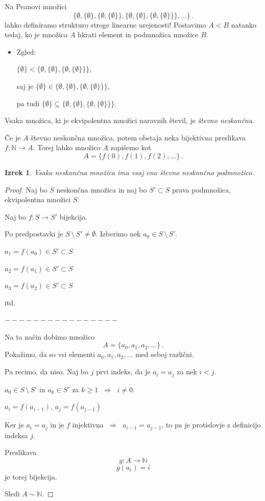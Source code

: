 \documentclass[11pt,paper=b5,DIV=13,headinclude,footinclude]{scrbook}
\def\sledi {{~\Rightarrow~}}
\def\brez {{\,\setminus\,}}
\newtheorem*{izrek}{Izrek}
\begin{document}
\bigskip
Na Peanovi množici
 $$\{\emptyset, \{\emptyset\}, \{\emptyset, \{\emptyset\}\}, \{\emptyset, \{\emptyset\}, \{\emptyset, \{\emptyset\}\}\}, \ldots\}\,.$$
lahko definiramo strukturo stroge linearne urejenosti! Postavimo
$A<B$ natanko tedaj, ko je množica $A$ hkrati element in podmnožica množice $B$.
\begin{itemize}
  \item Zgled:

  $\{\emptyset\} < \{\emptyset, \{\emptyset\}, \{\emptyset, \{\emptyset\}\}\}$,

      saj je $\{\emptyset\} \in \{\emptyset, \{\emptyset\}, \{\emptyset, \{\emptyset\}\}\}$,

      pa tudi $\{\emptyset\} \subseteq  \{\emptyset, \{\emptyset\}, \{\emptyset, \{\emptyset\}\}\}$.
\end{itemize}

\bigskip

Vsaka množica, ki je ekvipolentna množici naravnih števil, je {\em števno neskončna}.

Če je $A$ števno neskončna množica, potem obstaja neka bijektivna preslikava $f:\mathbb{N}\to A$.
Torej lahko množico $A$ zapišemo kot
$$A = \{f(0), f(1), f(2),\ldots\}\,.$$

\begin{izrek}
Vsaka neskončna množica ima vsaj eno števno neskončno podmnožico.
\end{izrek}

\begin{proof}
Naj bo $S$ neskončna množica in naj bo $S'\subset S$ prava podmnožica, ekvipolentna množici $S$.

Naj bo $f:S\to S'$ bijekcija.

Po predpostavki je $S\brez S'\neq \emptyset$. Izberimo nek $a_0\in S\brez S'$.

$a_1 = f(a_0)\in S'\subset S$

$a_2 = f(a_1)\in S'\subset S$

$a_3 = f(a_2)\in S'\subset S$

itd.

$----------------$

Na ta način dobimo množico
$$A = \{a_0,a_1,a_2,\ldots\}\,.$$
Pokažimo, da so vsi elementi $a_0,a_1,a_2,\ldots$ med seboj različni.

Pa recimo, da niso. Naj bo $j$ prvi indeks, da je $a_i = a_j$ za nek $i<j$.

$a_0\in S\brez S'$ in $a_k\in S'$ za $k\ge 1$ $\sledi$ $i\neq 0$.

$a_i = f(a_{i-1})$, $a_j = f(a_{j-1})$

Ker je $a_i = a_j$ in je $f$ injektivna $\sledi$ $a_{i-1} = a_{j-1}$, to pa je protislovje z definicijo indeksa $j$.

Preslikava
$$g:A\to \mathbb{N}$$
$$g(a_i) = i$$
je torej bijekcija.

Sledi $A\sim \mathbb{N}$.
\end{proof}
\end{document}
